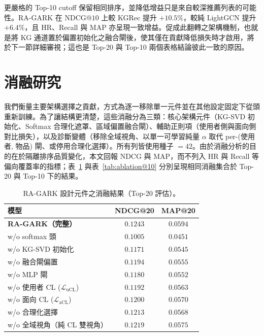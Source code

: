 更嚴格的 Top-10 cutoff 保留相同排序，並降低增益只是來自較深推薦列表的可能性。RA-GARK 在 NDCG@$10$ 上較 KGRec 提升 $+10.5\%$，較純 LightGCN 提升 $+6.4\%$，且 HR、Recall 與 MAP 亦呈現一致增益。促成此翻轉之架構機制，也就是將 KG 通道置於偏置初始化之融合閘後，使其僅在貢獻降低損失時才啟用，將於下一節詳細審視；這也是 Top-20 與 Top-10 兩個表格結論彼此一致的原因。

\section{消融研究}
\label{sec:eval-ablation-zh}
\label{sec:ablation-svd-zh}
\label{sec:ablation-softmax-zh}
\label{sec:ablation-gate-zh}

我們衡量主要架構選擇之貢獻，方式為逐一移除單一元件並在其他設定固定下從頭重新訓練。為了讓結構更清楚，這些消融分為三類：核心架構元件（KG-SVD 初始化、Softmax 合理化遮罩、區域偏置融合閘）、輔助正則項（使用者側與面向側對比損失），以及診斷變體（移除全域視角、以單一可學習純量 $\alpha$ 取代 per-(使用者, 物品) 閘、或停用合理化選擇）。所有列皆使用種子 $= 42$。由於消融分析的目的在於隔離排序品質變化，本文回報 NDCG 與 MAP，而不列入 HR 與 Recall 等偏向覆蓋率的指標；表~\ref{tab:ablation@20} 與表~\ref{tab:ablation@10} 分別呈現相同消融集合於 Top-20 與 Top-10 下的結果。

\begin{table}[H]
\centering
\caption{RA-GARK 設計元件之消融結果（Top-20 評估）。}
\label{tab:ablation@20}
\begin{tabular}{lcc}
\toprule
模型 & NDCG@20 & MAP@20 \\
\midrule
\textbf{RA-GARK（完整）}              & $\mathbf{0.1243}$ & $\mathbf{0.0594}$ \\
\midrule
w/o softmax 頭                 & $0.1005$ & $0.0451$ \\
w/o KG-SVD 初始化              & $0.1171$ & $0.0545$ \\
w/o 融合閘偏置                 & $0.1194$ & $0.0555$ \\
w/o MLP 閘                     & $0.1180$ & $0.0552$ \\
\midrule
w/o 使用者 CL ($\mathcal{L}_{\mathrm{uCL}}$)  & $0.1192$ & $0.0563$ \\
w/o 面向 CL ($\mathcal{L}_{\mathrm{aCL}}$) & $0.1200$ & $0.0570$ \\
\midrule
w/o 合理化選擇                & $0.1213$ & $0.0568$ \\
w/o 全域視角（純 CL 雙視角）   & $0.1219$ & $0.0575$ \\
\bottomrule
\end{tabular}
\end{table}

